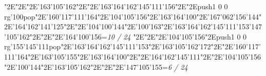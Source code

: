 \null\vfill\enskip\enskip\enskip\ipa\char"2E\enskip\enskip\enskip\ipa\char"2E\enskip\ipa\char"2E\enskip\enskip\enskip\bigskip\ipa\char'163\ipa\char'105\ipa\char'162\ipa\char"2E\enskip\enskip\enskip\ipa\char"2E\ipa\char'163\ipa\char'164\ipa\char'162\ipa\char'145\ipa\char'111\ipa\char'156\bigskip\enskip\enskip\ipa\char"2E\enskip\enskip\enskip\enskip\ipa\char"2E\pdfcolorstack\match push{1 0 0 rg}\ipa\char'100\pdfcolorstack\match pop{}\ipa\char"2E\ipa\char'160\ipa\char'117\ipa\char'111\ipa\char'164\ipa\char"2E\ipa\char'104\ipa\char'105\ipa\char'156\ipa\char"2E\ipa\char'163\ipa\char'164\ipa\char'100\ipa\char"2E\ipa\char'167\ipa\char'062\ipa\char'156\ipa\char'144\bigskip\enskip\ipa\char"2E\ipa\char'164\ipa\char'162\ipa\char'141\ipa\char'125\ipa\char"2E\enskip\enskip\ipa\char"2E\ipa\char'104\ipa\char'100\ipa\char'144\ipa\char"2E\ipa\char'100\ipa\char'163\ipa\char"2E\ipa\char'163\ipa\char'164\ipa\char'162\ipa\char'145\ipa\char'111\ipa\char'153\bigskip\ipa\char'147\ipa\char'105\ipa\char'162\ipa\char"2E\enskip\enskip\ipa\char"2E\enskip\enskip\enskip\ipa\char"2E\ipa\char'164\ipa\char'100\ipa\char'156\bigskip\vfill\footline={\hfill\tenrm\it 10 / 24}\eject
\null\vfill\enskip\enskip\enskip\ipa\char"2E\enskip\enskip\enskip\ipa\char"2E\enskip\ipa\char"2E\enskip\enskip\enskip\bigskip\ipa\char'104\ipa\char'105\ipa\char'156\ipa\char"2E\pdfcolorstack\match push{1 0 0 rg}\ipa\char'155\ipa\char'145\ipa\char'111\pdfcolorstack\match pop{}\ipa\char"2E\ipa\char'163\ipa\char'164\ipa\char'162\ipa\char'145\ipa\char'111\ipa\char'153\bigskip\enskip\enskip\ipa\char"2E\ipa\char'163\ipa\char'105\ipa\char'162\ipa\char'172\ipa\char"2E\enskip\ipa\char"2E\ipa\char'160\ipa\char'117\ipa\char'111\ipa\char'164\ipa\char"2E\ipa\char'163\ipa\char'105\ipa\char'155\ipa\char"2E\ipa\char'163\ipa\char'164\ipa\char'100\ipa\char"2E\enskip\enskip\enskip\enskip\bigskip\enskip\ipa\char"2E\ipa\char'164\ipa\char'162\ipa\char'145\ipa\char'111\ipa\char"2E\enskip\enskip\ipa\char"2E\ipa\char'104\ipa\char'105\ipa\char'156\ipa\char"2E\ipa\char'100\ipa\char'144\ipa\char"2E\enskip\enskip\enskip\enskip\enskip\enskip\bigskip\ipa\char'163\ipa\char'105\ipa\char'162\ipa\char"2E\enskip\enskip\ipa\char"2E\enskip\enskip\enskip\ipa\char"2E\ipa\char'147\ipa\char'105\ipa\char'155\bigskip\vfill\footline={\hfill\tenrm\it 6 / 24}\eject
